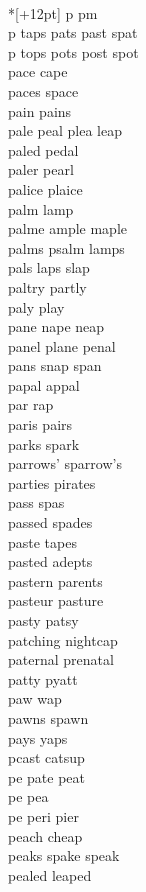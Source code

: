 \vspace{14pt}
\noindent\notextbf{\LargeP}\\*[+12pt]
p pm \\
p taps pats past spat   \\
p tops pots post spot   \\
pace cape\\
paces space\\
pain pains \\
pale peal plea leap\\
paled pedal\\
paler pearl\\
palice plaice\\
palm lamp\\
palme ample maple\\
palms psalm lamps\\
pals laps slap\\
paltry partly\\
paly play\\
pane nape neap\\
panel plane penal\\
pans snap span\\
papal appal\\
par rap\\
paris pairs\\
parks spark\\
parrows' sparrow's \\
parties pirates\\
pass spas\\
passed spades\\
paste tapes\\
pasted adepts\\
pastern parents\\
pasteur pasture\\
pasty patsy\\
patching nightcap\\
paternal prenatal\\
patty pyatt\\
paw wap\\
pawns spawn\\
pays yaps\\
pcast catsup \\
pe pate peat  \\
pe pea \\
pe peri pier  \\
peach cheap\\
peaks spake speak\\
pealed leaped\\

